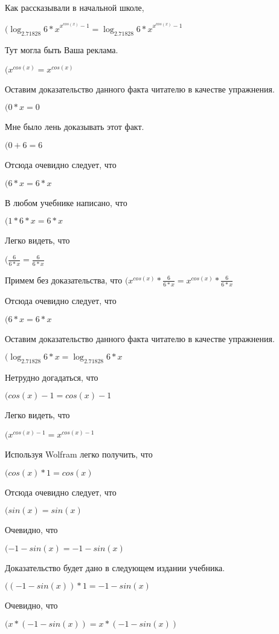 \documentclass[12pt,a4paper,fleqn]{article}
\theoremstyle{definition}
\begin{document}
Как рассказывали в начальной школе,

$({\log_{ 2.71828 }{ 6  *  x }}^{{ x }^{cos( x )} -  1 } = {\log_{ 2.71828 }{ 6  *  x }}^{{ x }^{cos( x )} -  1 }$

Тут могла быть Ваша реклама.

$({ x }^{cos( x )} = { x }^{cos( x )}$

Оставим доказательство данного факта читателю в качестве упражнения.

$( 0  *  x  =  0 $

Мне было лень доказывать этот факт.

$( 0  +  6  =  6 $

Отсюда очевидно следует, что

$( 6  *  x  =  6  *  x $

В любом учебнике написано, что

$( 1  *  6  *  x  =  6  *  x $

Легко видеть, что

$(\frac{ 6 }{ 6  *  x }
 = \frac{ 6 }{ 6  *  x }
$

Примем без доказательства, что
$({ x }^{cos( x )} * \frac{ 6 }{ 6  *  x }
 = { x }^{cos( x )} * \frac{ 6 }{ 6  *  x }
$

Отсюда очевидно следует, что

$( 6  *  x  =  6  *  x $

Оставим доказательство данного факта читателю в качестве упражнения.

$(\log_{ 2.71828 }{ 6  *  x } = \log_{ 2.71828 }{ 6  *  x }$

Нетрудно догадаться, что

$(cos( x ) -  1  = cos( x ) -  1 $

Легко видеть, что

$({ x }^{cos( x ) -  1 } = { x }^{cos( x ) -  1 }$

Используя Wolfram легко получить, что

$(cos( x ) *  1  = cos( x )$

Отсюда очевидно следует, что

$(sin( x ) = sin( x )$

Очевидно, что

$( -1  - sin( x ) =  -1  - sin( x )$

Доказательство будет дано в следующем издании учебника.

$(( -1  - sin( x )) *  1  =  -1  - sin( x )$

Очевидно, что

$( x  * ( -1  - sin( x )) =  x  * ( -1  - sin( x ))$
\end{document}
